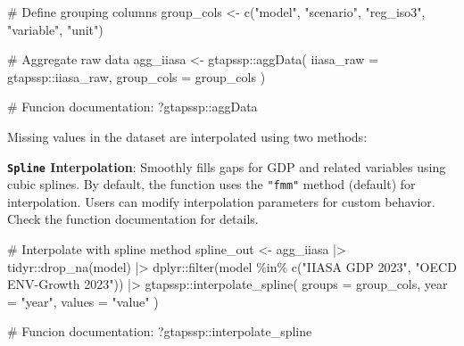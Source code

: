 \documentclass[
  letterpaper,
  DIV=11,
  numbers=noendperiod]{scrartcl}
\newenvironment{Shaded}{}{}
\newcommand{\AttributeTok}[1]{\textcolor[rgb]{0.00,0.34,0.68}{#1}}
\newcommand{\CommentTok}[1]{\textcolor[rgb]{0.54,0.53,0.53}{#1}}
\newcommand{\FunctionTok}[1]{\textcolor[rgb]{0.39,0.29,0.61}{#1}}
\newcommand{\NormalTok}[1]{\textcolor[rgb]{0.12,0.11,0.11}{#1}}
\newcommand{\OtherTok}[1]{\textcolor[rgb]{0.00,0.43,0.16}{#1}}
\newcommand{\SpecialCharTok}[1]{\textcolor[rgb]{0.24,0.68,0.91}{#1}}
\newcommand{\StringTok}[1]{\textcolor[rgb]{0.75,0.01,0.01}{#1}}
\begin{document}
\begin{Shaded}
\begin{Highlighting}[]
\CommentTok{\# Define grouping columns}
\NormalTok{group\_cols }\OtherTok{\textless{}{-}} \FunctionTok{c}\NormalTok{(}\StringTok{"model"}\NormalTok{, }\StringTok{"scenario"}\NormalTok{, }\StringTok{"reg\_iso3"}\NormalTok{, }\StringTok{"variable"}\NormalTok{, }\StringTok{"unit"}\NormalTok{)}

\CommentTok{\# Aggregate raw data}
\NormalTok{agg\_iiasa }\OtherTok{\textless{}{-}}\NormalTok{ gtapssp}\SpecialCharTok{::}\FunctionTok{aggData}\NormalTok{(}
  \AttributeTok{iiasa\_raw =}\NormalTok{ gtapssp}\SpecialCharTok{::}\NormalTok{iiasa\_raw,}
  \AttributeTok{group\_cols =}\NormalTok{ group\_cols}
\NormalTok{)}

\CommentTok{\# Funcion documentation:}
\NormalTok{?gtapssp}\SpecialCharTok{::}\NormalTok{aggData}
\end{Highlighting}
\end{Shaded}

Missing values in the dataset are interpolated using two methods:

\textbf{\texttt{Spline} Interpolation}: Smoothly fills gaps for GDP and
related variables using cubic splines. By default, the function uses the
\texttt{"fmm"} method (default) for interpolation. Users can modify
interpolation parameters for custom behavior. Check the function
documentation for details.

\begin{Shaded}
\begin{Highlighting}[]
\CommentTok{\# Interpolate with spline method}
\NormalTok{spline\_out }\OtherTok{\textless{}{-}}\NormalTok{ agg\_iiasa }\SpecialCharTok{|\textgreater{}}
\NormalTok{  tidyr}\SpecialCharTok{::}\FunctionTok{drop\_na}\NormalTok{(model) }\SpecialCharTok{|\textgreater{}}
\NormalTok{  dplyr}\SpecialCharTok{::}\FunctionTok{filter}\NormalTok{(model }\SpecialCharTok{\%in\%} \FunctionTok{c}\NormalTok{(}\StringTok{"IIASA GDP 2023"}\NormalTok{, }\StringTok{"OECD ENV{-}Growth 2023"}\NormalTok{)) }\SpecialCharTok{|\textgreater{}}
\NormalTok{  gtapssp}\SpecialCharTok{::}\FunctionTok{interpolate\_spline}\NormalTok{(}
    \AttributeTok{groups =}\NormalTok{ group\_cols,}
    \AttributeTok{year =} \StringTok{"year"}\NormalTok{,}
    \AttributeTok{values =} \StringTok{"value"}
\NormalTok{  )}

\CommentTok{\# Funcion documentation:}
\NormalTok{?gtapssp}\SpecialCharTok{::}\NormalTok{interpolate\_spline}
\end{Highlighting}
\end{Shaded}
\end{document}
